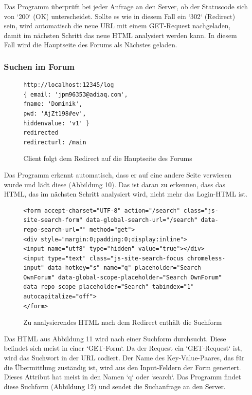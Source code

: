Das Programm überprüft bei jeder Anfrage an den Server, ob der Statuscode sich von `200` (OK) unterscheidet. Sollte es wie in diesem Fall ein `302` (Redirect) sein, wird automatisch die neue URL mit einem GET-Request nachgeladen, damit im nächsten Schritt das neue HTML analysiert werden kann. In diesem Fall wird die Hauptseite des Forums als Nächstes geladen.
\newpage

\subsubsection{Suchen im Forum}

\begin{figure}[ht]
\begin{lstlisting}[language=HTML5]
http://localhost:12345/log
{ email: 'jpm96353@adiaq.com',
fname: 'Dominik',
pwd: 'AjZt198#ev',
hiddenvalue: 'v1' }
redirected
redirecturl: /main
\end{lstlisting}
\caption{Client folgt dem Redirect auf die Hauptseite des Forums}
\end{figure}

Das Programm erkennt automatisch, dass er auf eine andere Seite verwiesen wurde und lädt diese (Abbildung 10). Das ist daran zu erkennen, dass das HTML, das im nächsten Schritt analysiert wird, nicht mehr das Login-HTML ist.

\begin{figure}[h!]
\begin{lstlisting}[language=HTML5]
<form accept-charset="UTF-8" action="/search" class="js-site-search-form" data-global-search-url="/search" data-repo-search-url="" method="get">
<div style="margin:0;padding:0;display:inline">
<input name="utf8" type="hidden" value="true"></div>
<input type="text" class="js-site-search-focus chromeless-input" data-hotkey="s" name="q" placeholder="Search OwnForum" data-global-scope-placeholder="Search OwnForum" data-repo-scope-placeholder="Search" tabindex="1" autocapitalize="off">
</form>
\end{lstlisting}
\caption{Zu analysierendes HTML nach dem Redirect enthält die Suchform}
\end{figure}

Das HTML aus Abbildung 11 wird nach einer Suchform durchsucht. Diese befindet sich meist in einer `GET-Form`. Da der Request ein `GET-Request` ist, wird das Suchwort in der URL codiert. Der Name des Key-Value-Paares, das für die Übermittlung zuständig ist, wird aus den Input-Feldern der Form generiert. Dieses Attribut hat meist in den Namen `q` oder `search`. Das Programm findet diese Suchform (Abbildung 12) und sendet die Suchanfrage an den Server.


